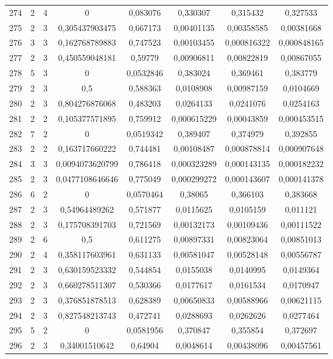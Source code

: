\begin{longtable}{|c|c|c|c|c|c|c|c|}
274 & 2 & 4 & 0 & 0,083076 & 0,330307 & 0,315432 & 0,327533  \\
275 & 2 & 3 & 0,305437903475 & 0,667173 & 0,00401135 & 0,00358585 & 0,00381668  \\
276 & 3 & 3 & 0,162768789883 & 0,747523 & 0,00103455 & 0,000816322 & 0,000848165  \\
277 & 2 & 3 & 0,450559048181 & 0,59779 & 0,00906811 & 0,00822819 & 0,00867055  \\
278 & 5 & 3 & 0 & 0,0532846 & 0,383024 & 0,369461 & 0,383779  \\
279 & 2 & 3 & 0,5 & 0,588363 & 0,0108908 & 0,00987159 & 0,0104669  \\
280 & 2 & 3 & 0,804276876068 & 0,483203 & 0,0264133 & 0,0241076 & 0,0254163  \\
281 & 2 & 2 & 0,105377571895 & 0,759912 & 0,000615229 & 0,00043859 & 0,000453515  \\
282 & 7 & 2 & 0 & 0,0519342 & 0,389407 & 0,374979 & 0,392855  \\
283 & 2 & 2 & 0,163717660222 & 0,744481 & 0,00108487 & 0,000878814 & 0,000907648  \\
284 & 3 & 3 & 0,0094073620799 & 0,786418 & 0,000323289 & 0,000143135 & 0,000182232  \\
285 & 2 & 3 & 0,0477108646646 & 0,775049 & 0,000299272 & 0,000143607 & 0,000141378  \\
286 & 6 & 2 & 0 & 0,0570464 & 0,38065 & 0,366103 & 0,383668  \\
287 & 2 & 3 & 0,54964489262 & 0,571877 & 0,0115625 & 0,0105159 & 0,011121  \\
288 & 2 & 3 & 0,175708391703 & 0,721569 & 0,00132173 & 0,00109436 & 0,00111522  \\
289 & 2 & 6 & 0,5 & 0,611275 & 0,00897331 & 0,00823064 & 0,00851013  \\
290 & 2 & 4 & 0,358117603961 & 0,631133 & 0,00581047 & 0,00528148 & 0,00556787  \\
291 & 2 & 3 & 0,630159523332 & 0,544854 & 0,0155038 & 0,0140995 & 0,0149364  \\
292 & 2 & 3 & 0,660278511307 & 0,530366 & 0,0177617 & 0,0161534 & 0,0170947  \\
293 & 2 & 3 & 0,376851878513 & 0,628389 & 0,00650833 & 0,00588966 & 0,00621115  \\
294 & 2 & 3 & 0,827548213743 & 0,472741 & 0,0288693 & 0,0262626 & 0,0277464  \\
295 & 5 & 2 & 0 & 0,0581956 & 0,370847 & 0,355854 & 0,372697  \\
296 & 2 & 3 & 0,34001510642 & 0,64904 & 0,0048614 & 0,00438096 & 0,00457561  \\

\end{longtable}
